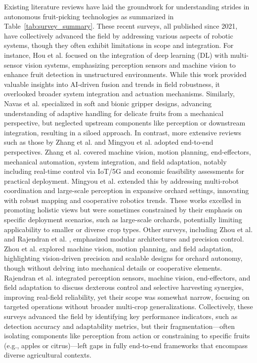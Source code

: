 \documentclass{ieeeaccess}
\begin{document}
Existing literature reviews have laid the groundwork for understanding strides in autonomous fruit-picking technologies as summarized in Table~\ref{tab:survey_summary}. These recent surveys, all published since 2021, have collectively advanced the field by addressing various aspects of robotic systems, though they often exhibit limitations in scope and integration.
For instance, Hou et al. \cite{hou2023overview} focused on the integration of deep learning (DL) with multi-sensor vision systems, emphasizing perception sensors and machine vision to enhance fruit detection in unstructured environments. While this work provided valuable insights into AI-driven fusion and trends in field robustness, it overlooked broader system integration and actuation mechanisms. Similarly, Navas et al. \cite{navas2021soft} specialized in soft and bionic gripper designs, advancing understanding of adaptive handling for delicate fruits from a mechanical perspective, but neglected upstream components like perception or downstream integration, resulting in a siloed approach.
In contrast, more extensive reviews such as those by Zhang et al. \cite{zhang2024automatic} and Mingyou et al. \cite{mingyou2024orchard} adopted end-to-end perspectives. Zhang et al. covered machine vision, motion planning, end-effectors, mechanical automation, system integration, and field adaptation, notably including real-time control via IoT/5G and economic feasibility assessments for practical deployment. Mingyou et al. extended this by addressing multi-robot coordination and large-scale perception in expansive orchard settings, innovating with robust mapping and cooperative robotics trends. These works excelled in promoting holistic views but were sometimes constrained by their emphasis on specific deployment scenarios, such as large-scale orchards, potentially limiting applicability to smaller or diverse crop types.
Other surveys, including Zhou et al. \cite{zhou2022intelligent} and Rajendran et al. \cite{rajendran2024towards}, emphasized modular architectures and precision control. Zhou et al. explored machine vision, motion planning, and field adaptation, highlighting vision-driven precision and scalable designs for orchard autonomy, though without delving into mechanical details or cooperative elements. Rajendran et al. integrated perception sensors, machine vision, end-effectors, and field adaptation to discuss dexterous control and selective harvesting synergies, improving real-field reliability, yet their scope was somewhat narrow, focusing on targeted operations without broader multi-crop generalizations. Collectively, these surveys advanced the field by identifying key performance indicators, such as detection accuracy and adaptability metrics, but their fragmentation—often isolating components like perception from action or constraining to specific fruits (e.g., apples or citrus)—left gaps in fully end-to-end frameworks that encompass diverse agricultural contexts.
\end{document}
